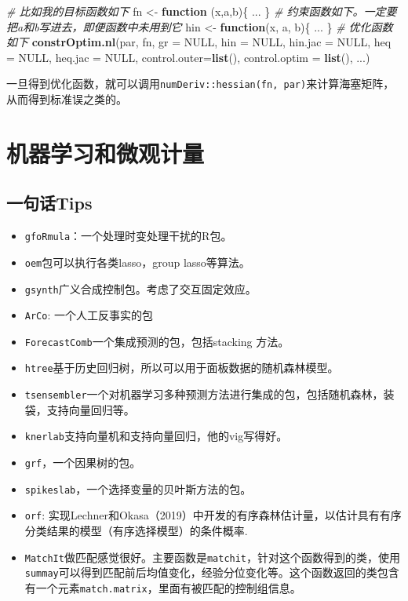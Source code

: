 \documentclass[
]{book}
\newenvironment{Shaded}{\begin{snugshade}}{\end{snugshade}}
\newcommand{\CommentTok}[1]{\textcolor[rgb]{0.56,0.35,0.01}{\textit{#1}}}
\newcommand{\ControlFlowTok}[1]{\textcolor[rgb]{0.13,0.29,0.53}{\textbf{#1}}}
\newcommand{\DataTypeTok}[1]{\textcolor[rgb]{0.13,0.29,0.53}{#1}}
\newcommand{\KeywordTok}[1]{\textcolor[rgb]{0.13,0.29,0.53}{\textbf{#1}}}
\newcommand{\NormalTok}[1]{#1}
\newcommand{\OtherTok}[1]{\textcolor[rgb]{0.56,0.35,0.01}{#1}}
\newcommand{\StringTok}[1]{\textcolor[rgb]{0.31,0.60,0.02}{#1}}
\providecommand{\tightlist}{%
  \setlength{\itemsep}{0pt}\setlength{\parskip}{0pt}}
\begin{document}
\begin{Shaded}
\begin{Highlighting}[]
\CommentTok{# 比如我的目标函数如下}
\NormalTok{fn <-}\StringTok{ }\ControlFlowTok{function}\NormalTok{ (x,a,b)\{}
\NormalTok{    ...}
\NormalTok{\}}
\CommentTok{# 约束函数如下。一定要把a和b写进去，即便函数中未用到它}
\NormalTok{hin <-}\StringTok{ }\ControlFlowTok{function}\NormalTok{(x, a, b)\{}
\NormalTok{    ...}
\NormalTok{\}}
\CommentTok{# 优化函数如下}
\KeywordTok{constrOptim.nl}\NormalTok{(par, fn, }\DataTypeTok{gr =} \OtherTok{NULL}\NormalTok{, }
\DataTypeTok{hin =} \OtherTok{NULL}\NormalTok{, }\DataTypeTok{hin.jac =} \OtherTok{NULL}\NormalTok{, }\DataTypeTok{heq =} \OtherTok{NULL}\NormalTok{, }\DataTypeTok{heq.jac =} \OtherTok{NULL}\NormalTok{, }
\DataTypeTok{control.outer=}\KeywordTok{list}\NormalTok{(), }\DataTypeTok{control.optim =} \KeywordTok{list}\NormalTok{(), ...)}
\end{Highlighting}
\end{Shaded}

一旦得到优化函数，就可以调用\texttt{numDeriv::hessian(fn,\ par)}来计算海塞矩阵，从而得到标准误之类的。

\hypertarget{ML}{%
\chapter{机器学习和微观计量}\label{ML}}

\hypertarget{ux4e00ux53e5ux8bddtips-6}{%
\section{一句话Tips}\label{ux4e00ux53e5ux8bddtips-6}}

\begin{itemize}
\tightlist
\item
  \texttt{gfoRmula}：一个处理时变处理干扰的R包。
\item
  \texttt{oem}包可以执行各类lasso，group lasso等算法。
\item
  \texttt{gsynth}广义合成控制包。考虑了交互固定效应。
\item
  \texttt{ArCo}: 一个人工反事实的包
\item
  \texttt{ForecastComb}一个集成预测的包，包括stacking 方法。
\item
  \texttt{htree}基于历史回归树，所以可以用于面板数据的随机森林模型。
\item
  \texttt{tsensembler}一个对机器学习多种预测方法进行集成的包，包括随机森林，装袋，支持向量回归等。
\item
  \texttt{knerlab}支持向量机和支持向量回归，他的vig写得好。
\item
  \texttt{grf}，一个因果树的包。
\item
  \texttt{spikeslab}，一个选择变量的贝叶斯方法的包。
\item
  \texttt{orf}: 实现Lechner和Okasa（2019）中开发的有序森林估计量，以估计具有有序分类结果的模型（有序选择模型）的条件概率.
\item
  \texttt{MatchIt}做匹配感觉很好。主要函数是\texttt{matchit}，针对这个函数得到的类，使用\texttt{summay}可以得到匹配前后均值变化，经验分位变化等。这个函数返回的类包含有一个元素\texttt{match.matrix}，里面有被匹配的控制组信息。
\end{itemize}
\end{document}
